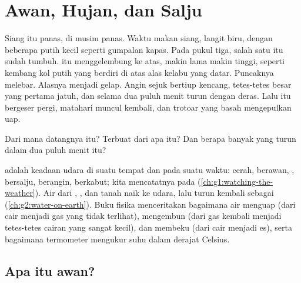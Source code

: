 \chapter{Awan, Hujan, dan Salju}\label{ch:g4:clouds-rain-snow}

Siang itu panas, di musim panas. Waktu makan siang, langit biru, dengan
beberapa  putih kecil seperti gumpalan kapas. Pada pukul tiga, salah
satu  itu sudah tumbuh.  itu menggelembung ke atas, makin lama
makin tinggi, seperti kembang kol putih yang berdiri di atas alas kelabu
yang datar. Puncaknya melebar. Alasnya menjadi gelap. Angin sejuk bertiup
kencang, tetes-tetes besar yang pertama jatuh, dan selama dua puluh menit
 turun dengan deras. Lalu  itu bergeser pergi, matahari muncul
kembali, dan trotoar yang basah mengepulkan uap.

Dari mana datangnya  itu? Terbuat dari apa  itu? Dan berapa banyak
 yang turun dalam dua puluh menit itu?

\begin{recall}
 adalah keadaan udara di suatu tempat dan pada suatu waktu: cerah,
berawan, , bersalju, berangin, berkabut; kita mencatatnya pada  (\cref{ch:g1:watching-the-weather}). Air dari , , dan tanah
naik ke udara, lalu turun kembali sebagai 
(\cref{ch:g2:water-on-earth}). Buku fisika menceritakan bagaimana air
menguap (dari cair menjadi gas yang tidak terlihat), mengembun (dari gas
kembali menjadi tetes-tetes cairan yang sangat kecil), dan membeku (dari
cair menjadi es), serta bagaimana termometer mengukur suhu dalam derajat
Celsius.
\end{recall}

\section{Apa itu awan?}

